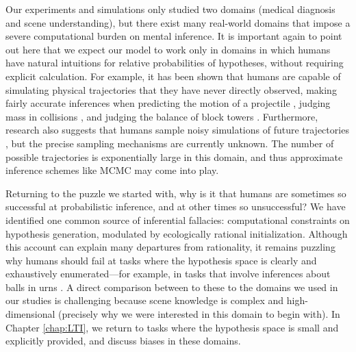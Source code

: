 Our experiments and simulations only studied two domains (medical diagnosis and scene understanding), but there exist many real-world domains that impose a severe computational burden on mental inference. 
It is important again to point out here that we expect our model to work only in domains in which humans have natural intuitions for relative probabilities of hypotheses, without requiring explicit calculation. 
For example, it has been shown that humans are capable of simulating physical trajectories that they have never directly observed, making fairly accurate inferences when predicting the motion of a projectile \citep{motion}, judging mass in collisions \citep{collision}, and judging the balance of block towers \citep{blocks}. Furthermore, research also suggests that humans sample noisy simulations of future trajectories \citep{smith2013sources,hamrick2015think}, but the precise sampling mechanisms are currently unknown. The number of possible trajectories is exponentially large in this domain, and thus approximate inference schemes like MCMC may come into play.


Returning to the puzzle we started with, why is it that humans are sometimes so successful at probabilistic inference, and at other times so unsuccessful? We have identified one common source of inferential fallacies: computational constraints on hypothesis generation, modulated by ecologically rational initialization. Although this account can explain many departures from rationality, it remains puzzling why humans should fail at tasks where the hypothesis space is clearly and exhaustively enumerated---for example, in tasks that involve inferences about balls in urns \citep[see][for a review]{peterson1967man}. A direct comparison between to these to the domains we used in our studies is challenging because scene knowledge is complex and high-dimensional (precisely why we were interested in this domain to begin with). In Chapter \ref{chap:LTI}, we return to tasks where the hypothesis space is small and explicitly provided, and discuss biases in these domains.

